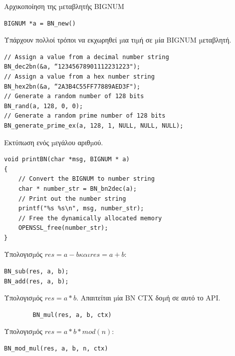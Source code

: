 \noindent
Αρχικοποίηση της µεταβλητής BIGNUM
\begin{center}
	\begin{lstlisting}	
BIGNUM *a = BN_new()	
	\end{lstlisting}	
\end{center}

\noindent
Υπάρχουν πολλοί τρόποι να εκχωρηθεί µια τιµή σε µία BIGNUM µεταβλητή.
\begin{center}
	\begin{lstlisting}	
// Assign a value from a decimal number string
BN_dec2bn(&a, “12345678901112231223");
// Assign a value from a hex number string
BN_hex2bn(&a, “2A3B4C55FF77889AED3F");
// Generate a random number of 128 bits
BN_rand(a, 128, 0, 0);
// Generate a random prime number of 128 bits
BN_generate_prime_ex(a, 128, 1, NULL, NULL, NULL);	
	\end{lstlisting}	
\end{center}

\noindent
Εκτύπωση ενός µεγάλου αριθµού.
\begin{center}
	\begin{lstlisting}	
void printBN(char *msg, BIGNUM * a)
{
	// Convert the BIGNUM to number string
	char * number_str = BN_bn2dec(a);
	// Print out the number string
	printf("%s %s\n", msg, number_str);
	// Free the dynamically allocated memory
	OPENSSL_free(number_str);
}	
	\end{lstlisting}	
\end{center}

\noindent
Υπολογισµός \(res = a − b και res = a + b:\)
\begin{center}
	\begin{lstlisting}	
BN_sub(res, a, b);
BN_add(res, a, b);	
	\end{lstlisting}	
\end{center}


\noindent
Υπολογισµός \(res = a * b.\) Απαιτείται µία BN CTX δοµή σε αυτό το API.
\begin{center}
	\begin{lstlisting}	
		BN_mul(res, a, b, ctx)
	\end{lstlisting}	
\end{center}

\noindent
Υπολογισµός \(res = a * b * mod(n):\)
\begin{center}
	\begin{lstlisting}	
BN_mod_mul(res, a, b, n, ctx)	
	\end{lstlisting}	
\end{center}

